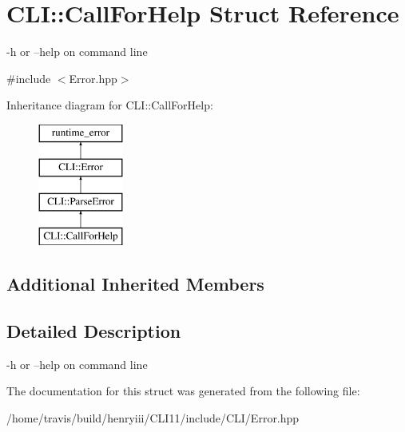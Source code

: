 \hypertarget{struct_c_l_i_1_1_call_for_help}{}\section{C\+LI\+:\+:Call\+For\+Help Struct Reference}
\label{struct_c_l_i_1_1_call_for_help}


-\/h or --help on command line  




{\ttfamily \#include $<$Error.\+hpp$>$}

Inheritance diagram for C\+LI\+:\+:Call\+For\+Help\+:\begin{figure}[H]
\begin{center}
\leavevmode
\includegraphics[height=4.000000cm]{struct_c_l_i_1_1_call_for_help}
\end{center}
\end{figure}
\subsection*{Additional Inherited Members}


\subsection{Detailed Description}
-\/h or --help on command line 

The documentation for this struct was generated from the following file\+:\begin{DoxyCompactItemize}
\item 
/home/travis/build/henryiii/\+C\+L\+I11/include/\+C\+L\+I/Error.\+hpp\end{DoxyCompactItemize}
